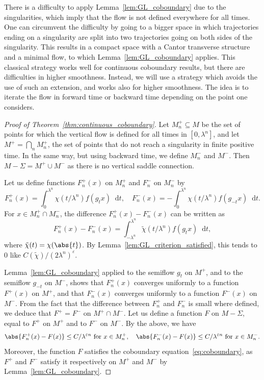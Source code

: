 \documentclass[JEP,XML,SOM,Unicode]{cedram}
\newcommand{\dd}{\mathop{}\!\mathrm{d}}
\let\epsilon\varepsilon
\theoremstyle{definition}
\numberwithin{equation}{section}
\begin{document}
There is a difficulty to apply Lemma~\ref{lem:GL_coboundary} due to the
singularities, which imply that the flow is not defined everywhere for all
times. One can circumvent the difficulty by going to a bigger space in which
trajectories ending on a singularity are split into two trajectories going on
both sides of the singularity. This results in a compact space with a Cantor
transverse structure and a minimal flow, to which
Lemma~\ref{lem:GL_coboundary} applies. This classical strategy works well for
continuous coboundary results, but there are difficulties in higher
smoothness. Instead, we will use a strategy which avoids the use of such an
extension, and works also for higher smoothness. The idea is to iterate the
flow in forward time or backward time depending on the point one considers.

\begin{proof}[Proof of Theorem~\ref{thm:continuous_coboundary}]
Let $M_n^+ \subseteq M$ be the set of points for which the vertical flow is
defined for all times in $[0,\lambda^n]$, and let $M^+ = \bigcap_n M_n^+$,
\ie the set of points that do not reach a singularity in finite positive
time. In the same way, but using backward time, we define $M_n^-$ and $M^-$.
Then $M -\Sigma = M^+ \cup M^-$ as there is no vertical saddle connection.

Let us define functions $F_n^+(x)$ on $M_n^+$ and $F_n^-$ on $M_n^-$ by
\begin{equation*}
F_n^+(x) = \int_0^{\lambda^n} \chi(t/\lambda^n) f(g_t x) \dd t, \quad F_n^-(x) = - \int_0^{\lambda^n} \chi(t/\lambda^n) f(g_{-t} x) \dd t.
\end{equation*}
For $x \in M_n^+ \cap M_n^-$, the difference $F_n^+(x) - F_n^-(x)$ can be
written as
\begin{equation*}
F_n^+(x) - F_n^-(x) = \int_{-\lambda^n}^{\lambda^n} \tilde \chi(t/\lambda^n) f(g_t x) \dd t,
\end{equation*}
where $\tilde \chi(t) = \chi(\abs{t})$. By
Lemma~\ref{lem:GL_criterion_satisfied}, this tends to $0$ like
$C(\tilde\chi)/(2\lambda^n)^\epsilon$.

Lemma~\ref{lem:GL_coboundary} applied to the semiflow $g_t$ on $M^+$, and to
the semiflow $g_{-t}$ on $M^-$, shows that $F_n^+(x)$ converges uniformly to
a function $F^+(x)$ on $M^+$, and that $F_n^-(x)$ converges uniformly to a
function $F^-(x)$ on $M^-$. From the fact that the difference between $F_n^+$
and $F_n^-$ is small where defined, we deduce that $F^+ = F^-$ on $M^+ \cap
M^-$. Let us define a function $F$ on $M-\Sigma$, equal to $F^+$ on $M^+$ and
to $F^-$ on $M^-$. By the above, we have
\begin{equation}
\label{eq:Fn+F}
\abs{F_n^+(x) - F(x)} \leq C/\lambda^{\epsilon n} \text{ for $x \in M_n^+$}, \quad
\abs{F_n^-(x) - F(x)} \leq C/\lambda^{\epsilon n} \text{ for $x \in M_n^-$}.
\end{equation}
Moreover, the function $F$ satisfies the coboundary
equation~\eqref{eq:coboundary}, as $F^+$ and $F^-$ satisfy it respectively on
$M^+$ and $M^-$ by Lemma~\ref{lem:GL_coboundary}.


\end{proof}
\end{document}
